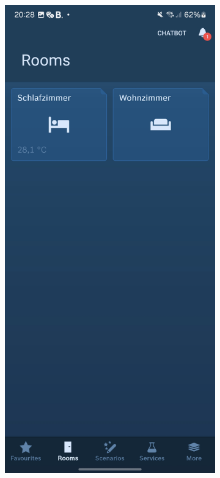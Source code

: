 \begin{figure}[t]
    \centering
      \begin{subfigure}{.48\textwidth}
        \includegraphics[width=\textwidth]{graphics/homescreen.jpg}

\end{subfigure}
\end{figure}
